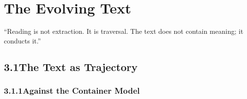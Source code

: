 \chapter{The Evolving Text}
\label{ch:03}

“Reading is not extraction. It is traversal. The text does not contain meaning; it conducts it.”

\section{3.1\quad The Text as Trajectory}

\subsection{3.1.1\quad Against the Container Model}

